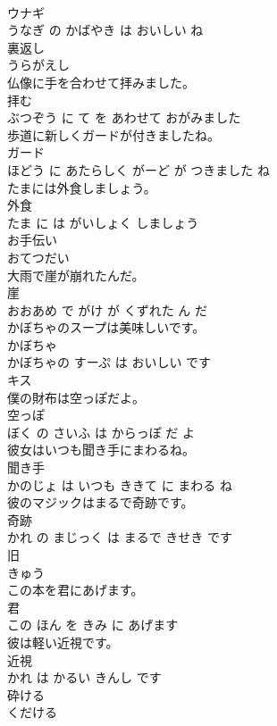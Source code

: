 \documentclass[8pt]{extreport}
\begin{document}
\begin{CJK}{UTF8}{min}
\\	ウナギ 
\\	うなぎ の かばやき は おいしい ね			
\\	裏返し	
\\	うらがえし			
\\	仏像に手を合わせて拝みました。	
\\	拝む 
\\	ぶつぞう に て を あわせて おがみました			
\\	歩道に新しくガードが付きましたね。	
\\	ガード 
\\	ほどう に あたらしく がーど が つきました ね			
\\	たまには外食しましょう。	
\\	外食 
\\	たま に は がいしょく しましょう			
\\	お手伝い	
\\	おてつだい			
\\	大雨で崖が崩れたんだ。	
\\	崖 
\\	おおあめ で がけ が くずれた ん だ			
\\	かぼちゃのスープは美味しいです。	
\\	かぼちゃ 
\\	かぼちゃの すーぷ は おいしい です			
\\	キス	
\\	僕の財布は空っぽだよ。	
\\	空っぽ 
\\	ぼく の さいふ は からっぽ だ よ			
\\	彼女はいつも聞き手にまわるね。	
\\	聞き手 
\\	かのじょ は いつも ききて に まわる ね			
\\	彼のマジックはまるで奇跡です。	
\\	奇跡 
\\	かれ の まじっく は まるで きせき です			
\\	旧	
\\	きゅう			
\\	この本を君にあげます。	
\\	君 
\\	この ほん を きみ に あげます			
\\	彼は軽い近視です。	
\\	近視 
\\	かれ は かるい きんし です			
\\	砕ける	
\\	くだける			

\end{CJK}
\end{document}
